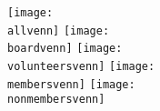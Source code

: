 \documentclass[border=15pt]{standalone}
\begin{document}
\begin{varwidth}{12in}
\begin{center}
    \begin{multicols}{2}
        \hspace{45pt} {\texttt{[image: \\allvenn]}}
        \hspace{45pt} {\texttt{[image: \\boardvenn]}}
        \hspace{45pt} {\texttt{[image: \\volunteersvenn]}}
        \hspace{45pt} {\texttt{[image: \\membersvenn]}}
        \hspace{45pt} {\texttt{[image: \\nonmembersvenn]}}
    \end{multicols}

\end{center}

\end{varwidth}
\end{document}
